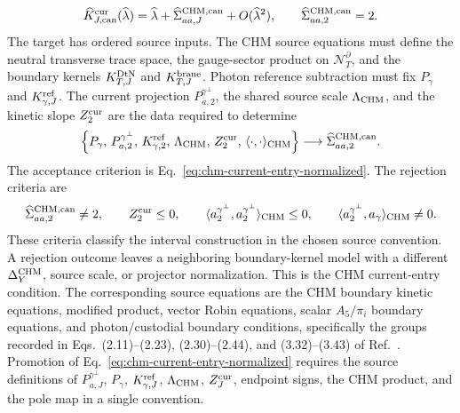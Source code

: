 \begin{widetext}
\begin{equation}
  \widehat K_{J,{\rm can}}^{\rm cur}(\widehat\lambda)
  =
  \widehat\lambda+\widehat\Sigma_{aa,J}^{\rm CHM,can}
  +O(\widehat\lambda^2),
  \qquad
  \widehat\Sigma_{aa,2}^{\rm CHM,can}=2 .
  \label{eq:chm-current-entry-normalized}
\end{equation}
The target has ordered source inputs.  The CHM source equations must define the
neutral transverse trace space, the gauge-sector product on
\(\mathcal N_T^\partial\), and the boundary kernels
\(K^{\rm DtN}_{T,J}\) and \(K^{\rm brane}_{T,J}\).  Photon reference
subtraction must fix \(P_\gamma\) and \(K_{\gamma,J}^{\rm ref}\).  The
current projection \(P_{a,2}^{\gamma^\perp}\), the shared source scale
\(\Lambda_{\rm CHM}\), and the kinetic slope \(Z_2^{\rm cur}\) are the data
required to determine
\begin{equation}
  \left\{
  P_\gamma,\,
  P_{a,2}^{\gamma^\perp},\,
  K_{\gamma,2}^{\rm ref},\,
  \Lambda_{\rm CHM},\,
  Z_2^{\rm cur},\,
  \langle\cdot,\cdot\rangle_{\rm CHM}
  \right\}
  \longrightarrow
  \widehat\Sigma_{aa,2}^{\rm CHM,can}.
  \label{eq:chm-current-protocol-chain}
\end{equation}
The acceptance criterion is Eq.~\eqref{eq:chm-current-entry-normalized}.  The
rejection criteria are
\begin{equation}
  \widehat\Sigma_{aa,2}^{\rm CHM,can}\ne2,\qquad
  Z_2^{\rm cur}\le0,\qquad
  \langle a_2^{\gamma^\perp},a_2^{\gamma^\perp}\rangle_{\rm CHM}\le0,
  \qquad
  \langle a_2^{\gamma^\perp},a_\gamma\rangle_{\rm CHM}\ne0 .
  \label{eq:chm-current-rejection-cases}
\end{equation}
These criteria classify the interval construction in the chosen source
convention.  A rejection outcome leaves a neighboring boundary-kernel model
with a different \(\Delta_Y^{\rm CHM}\), source scale, or projector
normalization.
This is the CHM current-entry condition.  The corresponding source
equations are the CHM boundary kinetic equations, modified product, vector
Robin equations, scalar \(A_5/\pi_i\) boundary equations, and photon/custodial
boundary conditions, specifically the groups recorded in
Eqs.~(2.11)--(2.23), (2.30)--(2.44), and (3.32)--(3.43) of
Ref.~\cite{CsakiHubiszMeade2005}.  Promotion of
Eq.~\eqref{eq:chm-current-entry-normalized} requires the source definitions of
\(P_{a,J}^{\gamma^\perp}\), \(P_\gamma\), \(K_{\gamma,J}^{\rm ref}\),
\(\Lambda_{\rm CHM}\), \(Z_J^{\rm cur}\), endpoint signs, the CHM product, and
the pole map in a single convention.


\end{widetext}
